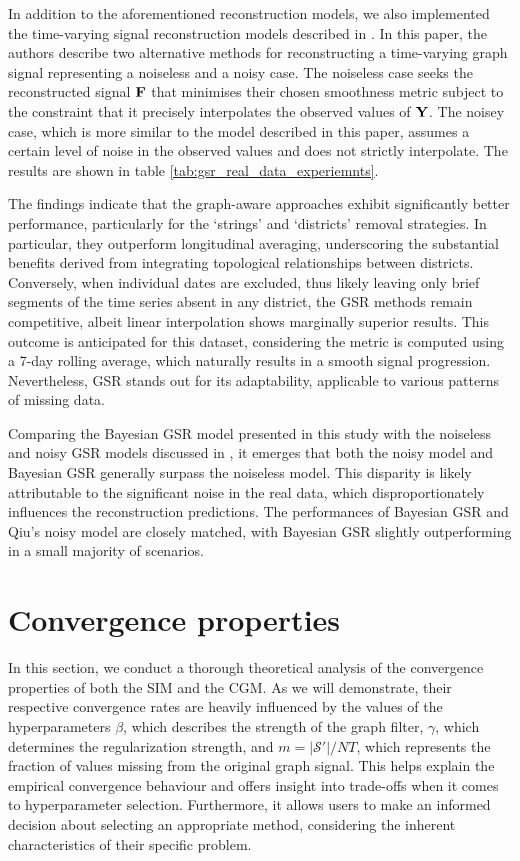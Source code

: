 In addition to the aforementioned reconstruction models, we also implemented the time-varying signal reconstruction models described in \cite{Qiu2017}. In this paper, the authors describe two alternative methods for reconstructing a time-varying graph signal representing a noiseless and a noisy case. The noiseless case seeks the reconstructed signal $\mathbf{F}$ that minimises their chosen smoothness metric subject to the constraint that it precisely interpolates the observed values of $\mathbf{Y}$. The noisey case, which is more similar to the model described in this paper, assumes a certain level of noise in the observed values and does not strictly interpolate. The results are shown in table \ref{tab:gsr_real_data_experiemnts}. 

The findings indicate that the graph-aware approaches exhibit significantly better performance, particularly for the `strings' and `districts' removal strategies. In particular, they outperform longitudinal averaging, underscoring the substantial benefits derived from integrating topological relationships between districts. Conversely, when individual dates are excluded, thus likely leaving only brief segments of the time series absent in any district, the GSR methods remain competitive, albeit linear interpolation shows marginally superior results. This outcome is anticipated for this dataset, considering the metric is computed using a 7-day rolling average, which naturally results in a smooth signal progression. Nevertheless, GSR stands out for its adaptability, applicable to various patterns of missing data.

Comparing the Bayesian GSR model presented in this study with the noiseless and noisy GSR models discussed in \cite{Qiu2017}, it emerges that both the noisy model and Bayesian GSR generally surpass the noiseless model. This disparity is likely attributable to the significant noise in the real data, which disproportionately influences the reconstruction predictions. The performances of Bayesian GSR and Qiu’s noisy model are closely matched, with Bayesian GSR slightly outperforming in a small majority of scenarios.

 
\section{Convergence properties}

\label{sec:convergence}

In this section, we conduct a thorough theoretical analysis of the convergence properties of both the SIM and the CGM. As we will demonstrate, their respective convergence rates are heavily influenced by the values of the hyperparameters $\beta$, which describes the strength of the graph filter, $\gamma$, which determines the regularization strength, and $m=|\mathcal{S}'|/NT$, which represents the fraction of values missing from the original graph signal. This helps explain the empirical convergence behaviour and offers insight into trade-offs when it comes to hyperparameter selection. Furthermore, it allows users to make an informed decision about selecting an appropriate method, considering the inherent characteristics of their specific problem. 

